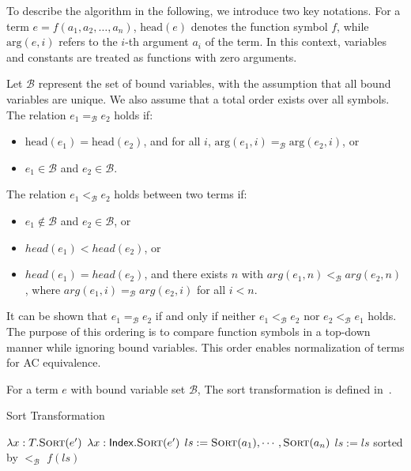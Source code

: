 To describe the algorithm in the following, we introduce two key notations. For a term \( e = f(a_1, a_2, \dots, a_n) \), \( \textrm{head}(e) \) denotes the function symbol \( f \), while \( \textrm{arg}(e, i) \) refers to the \( i \)-th argument \( a_i \) of the term. In this context, variables and constants are treated as functions with zero arguments.
\begin{definition}
Let \( \mathcal{B} \) represent the set of bound variables, with the assumption that all bound variables are unique. We also assume that a total order exists over all symbols. The relation \( e_1 =_\mathcal{B} e_2 \) holds if:
\begin{itemize}
    \item \( \textrm{head}(e_1) = \textrm{head}(e_2) \), and for all \( i \), \( \textrm{arg}(e_1, i) =_\mathcal{B} \textrm{arg}(e_2, i) \), or
    \item \( e_1 \in \mathcal{B} \) and \(e_2 \in \mathcal{B}\).
\end{itemize}

The relation \( e_1 <_\mathcal{B} e_2 \) holds between two terms if:
\begin{itemize}
    \item $e_1 \notin \mathcal{B}$ and $e_2 \in \mathcal{B}$, or
    \item $head(e_1) < head(e_2)$, or
    \item $head(e_1) = head(e_2)$, and there exists $n$ with $arg(e_1, n) <_\mathcal{B} arg(e_2, n)$, where $arg(e_1, i) =_\mathcal{B} arg(e_2, i)$ for all $i < n$.
\end{itemize}
\end{definition}
It can be shown that \( e_1 =_\mathcal{B} e_2 \) if and only if neither \( e_1 <_\mathcal{B} e_2 \) nor \( e_2 <_\mathcal{B} e_1 \) holds. The purpose of this ordering is to compare function symbols in a top-down manner while ignoring bound variables. This order enables normalization of terms for AC equivalence.
\begin{definition}
    For a term $e$ with bound variable set $\mathcal{B}$,
    The sort transformation is defined in~.
\end{definition}

\begin{algorithm}
    \caption{Sort Transformation}
    \label{alg: sort}
    \begin{algorithmic}[1]
                \State \Return $\lambda x : T . \textsc{Sort}(e')$
                \State \Return $\lambda x : \mathsf{Index} . \textsc{Sort}(e')$
                \State $ls := \textsc{Sort}(a_1), \cdots, \textsc{Sort}(a_n)$
                \State $ls := ls$ sorted by $<_\mathcal{B}$
                \State \Return $f(ls)$
            \EndIf
        \EndProcedure
    \end{algorithmic}
\end{algorithm}

